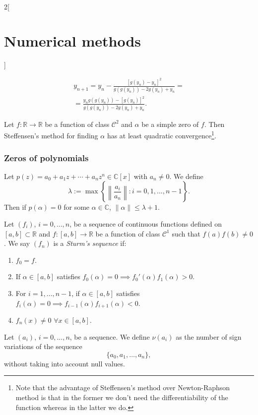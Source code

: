 \documentclass[class=article,10pt,crop=false]{standalone}
\begin{document}
\begin{multicols}{2}[\section{Numerical methods}]
\begin{theorem}
\begin{multline*}
    y_{n+1}=y_n-\frac{\left[g(y_n)-y_n\right]^2}{g(g(y_n))-2g(y_n)+y_n}=\\=\frac{y_ng(g(y_n))-\left[g(y_n)\right]^2}{g(g(y_n))-2g(y_n)+y_n}.
\end{multline*}
\end{theorem}
\begin{prop}
Let $f:\mathbb{R}\rightarrow\mathbb{R}$ be a function of class $\mathcal{C}^2$ and $\alpha$ be a simple zero of $f$. Then Steffensen's method for finding $\alpha$ has at least quadratic convergence\footnote{Note that the advantage of Steffensen's method over Newton-Raphson method is that in the former we don't need the differentiability of the function whereas in the latter we do.}.
\end{prop}
\subsubsection*{Zeros of polynomials}
\begin{lemma}
Let $p(z)=a_0+a_1z+\cdots+a_nz^n\in\mathbb{C}[x]$ with $a_n\ne 0$. We define $$\lambda:=\max\left\{\left\|\frac{a_i}{a_n}\right\|:i=0,1,\ldots,n-1\right\}.$$ Then if $p(\alpha)=0$ for some $\alpha\in\mathbb{C}$, $\|\alpha\|\leq\lambda+1$.
\end{lemma}
\begin{definition}
Let $(f_i)$, $i=0,\ldots,n$, be a sequence of continuous functions defined on $[a,b]\subset\mathbb{R}$ and $f:[a,b]\rightarrow\mathbb{R}$ be a function of class $\mathcal{C}^1$ such that $f(a)f(b)\ne 0$. We say $(f_n)$ is a \textit{Sturm's sequence} if:
\begin{enumerate}
    \item $f_0=f$.
    \item If $\alpha\in[a,b]$ satisfies $f_0(\alpha)=0\implies f_0'(\alpha)f_1(\alpha)>0$.
    \item For $i=1,\ldots,n-1$, if $\alpha\in[a,b]$ satisfies $f_i(\alpha)=0\implies f_{i-1}(\alpha)f_{i+1}(\alpha)<0$.
    \item $f_n(x)\ne0$ $\forall x\in[a,b]$.
\end{enumerate}
\end{definition}
\begin{definition}
Let $(a_i)$, $i=0,\ldots,n$, be a sequence. We define $\nu(a_i)$ as the number of sign variations of the sequence $$\{a_0,a_1,\ldots,a_n\},$$ without taking into account null values. 
\end{definition}
\begin{theorem}

\end{theorem}
\end{multicols}
\end{document}
